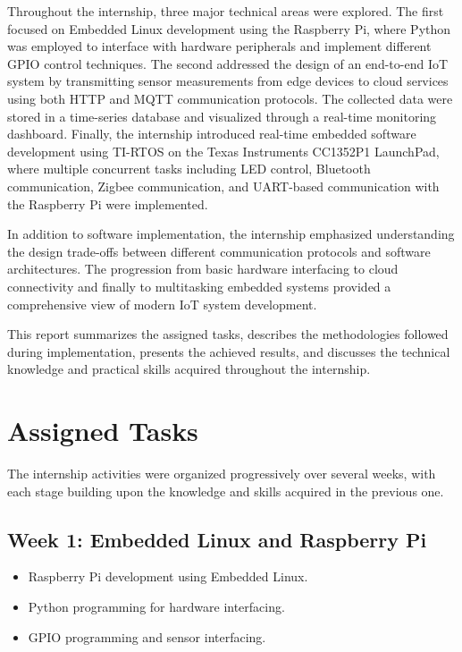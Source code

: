 \documentclass[conference]{IEEEtran}
\begin{document}
Throughout the internship, three major technical areas were explored. The first focused on Embedded Linux development using the Raspberry Pi, where Python was employed to interface with hardware peripherals and implement different GPIO control techniques. The second addressed the design of an end-to-end IoT system by transmitting sensor measurements from edge devices to cloud services using both HTTP and MQTT communication protocols. The collected data were stored in a time-series database and visualized through a real-time monitoring dashboard. Finally, the internship introduced real-time embedded software development using TI-RTOS on the Texas Instruments CC1352P1 LaunchPad, where multiple concurrent tasks including LED control, Bluetooth communication, Zigbee communication, and UART-based communication with the Raspberry Pi were implemented.

In addition to software implementation, the internship emphasized understanding the design trade-offs between different communication protocols and software architectures. The progression from basic hardware interfacing to cloud connectivity and finally to multitasking embedded systems provided a comprehensive view of modern IoT system development.

This report summarizes the assigned tasks, describes the methodologies followed during implementation, presents the achieved results, and discusses the technical knowledge and practical skills acquired throughout the internship.

\section{Assigned Tasks}

The internship activities were organized progressively over several weeks, with each stage building upon the knowledge and skills acquired in the previous one. \cite{repo}

\subsection*{Week 1: Embedded Linux and Raspberry Pi}
\begin{itemize}
    \item Raspberry Pi development using Embedded Linux.
    \item Python programming for hardware interfacing.
    \item GPIO programming and sensor interfacing.
\end{itemize}
\end{document}
